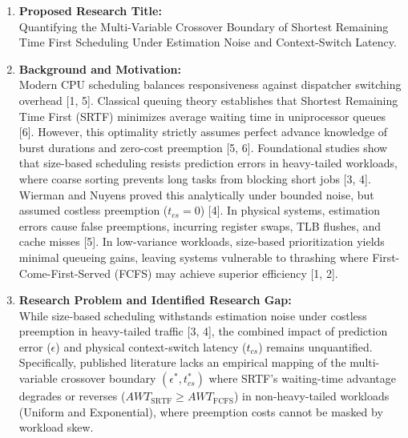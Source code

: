 \documentclass[11pt]{article}
\begin{document}
\begin{enumerate}[label=\textbf{\arabic*.}, leftmargin=1.4em, itemsep=0.45em, parsep=0pt]

    \item \textbf{Proposed Research Title:} \\
    Quantifying the Multi-Variable Crossover Boundary of Shortest Remaining Time First Scheduling Under Estimation Noise and Context-Switch Latency.

    \item \textbf{Background and Motivation:} \\
    Modern CPU scheduling balances responsiveness against dispatcher switching overhead [1, 5]. Classical queuing theory establishes that Shortest Remaining Time First (SRTF) minimizes average waiting time in uniprocessor queues [6]. However, this optimality strictly assumes perfect advance knowledge of burst durations and zero-cost preemption [5, 6]. Foundational studies show that size-based scheduling resists prediction errors in heavy-tailed workloads, where coarse sorting prevents long tasks from blocking short jobs [3, 4]. Wierman and Nuyens proved this analytically under bounded noise, but assumed costless preemption ($t_{cs} = 0$) [4]. In physical systems, estimation errors cause false preemptions, incurring register swaps, TLB flushes, and cache misses [5]. In low-variance workloads, size-based prioritization yields minimal queueing gains, leaving systems vulnerable to thrashing where First-Come-First-Served (FCFS) may achieve superior efficiency [1, 2].

    \item \textbf{Research Problem and Identified Research Gap:} \\
    While size-based scheduling withstands estimation noise under costless preemption in heavy-tailed traffic [3, 4], the combined impact of prediction error ($\epsilon$) and physical context-switch latency ($t_{cs}$) remains unquantified. Specifically, published literature lacks an empirical mapping of the multi-variable crossover boundary $(\epsilon^*, t_{cs}^*)$ where SRTF's waiting-time advantage degrades or reverses ($AWT_{\text{SRTF}} \ge AWT_{\text{FCFS}}$) in non-heavy-tailed workloads (Uniform and Exponential), where preemption costs cannot be masked by workload skew.


\end{enumerate}
\end{document}
